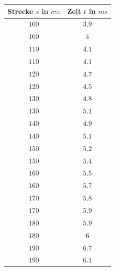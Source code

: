 \begin{center}
\begin{tabular}{c|c}
Strecke \(s\) in \(cm\) & Zeit \(t\) in \(ms\) \\\hline
\(100\) & \( 3.9\) \\
\(100\) & \( 4\) \\
\(110\) & \( 4.1\) \\
\(110\) & \( 4.1\) \\
\(120\) & \( 4.7\) \\
\(120\) & \( 4.5\) \\
\(130\) & \( 4.8\) \\
\(130\) & \( 5.1\) \\
\(140\) & \( 4.9\) \\
\(140\) & \( 5.1\) \\
\(150\) & \( 5.2\) \\
\(150\) & \( 5.4\) \\
\(160\) & \( 5.5\) \\
\(160\) & \( 5.7\) \\
\(170\) & \( 5.8\) \\
\(170\) & \( 5.9\) \\
\(180\) & \( 5.9\) \\
\(180\) & \( 6\) \\
\(190\) & \( 6.7\) \\
\(190\) & \( 6.1\) \\
\end{tabular}
\end{center}
